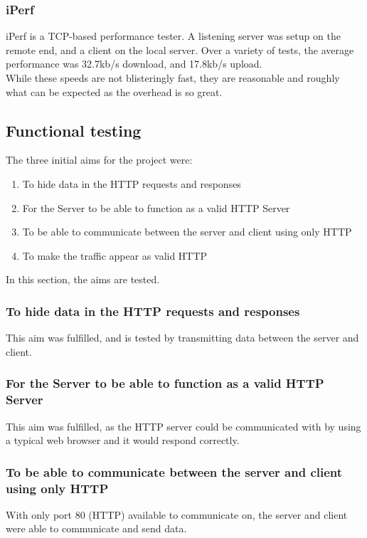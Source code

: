 \subsubsection*{iPerf}
iPerf is a TCP-based performance tester.
A listening server was setup on the remote end, and a client on the local server.
Over a variety of tests, the average performance was 32.7kb/s download, and 17.8kb/s upload.\\
While these speeds are not blisteringly fast, they are reasonable and roughly what can be expected as the overhead is so great.

\subsection{Functional testing}
The three initial aims for the project were:
\begin{enumerate}
    \item To hide data in the HTTP requests and responses
    \item For the Server to be able to function as a valid HTTP Server
    \item To be able to communicate between the server and client using only HTTP
    \item To make the traffic appear as valid HTTP
\end{enumerate}
In this section, the aims are tested.
\subsubsection*{To hide data in the HTTP requests and responses}
This aim was fulfilled, and is tested by transmitting data between the server and client.

\subsubsection*{For the Server to be able to function as a valid HTTP Server}
This aim was fulfilled, as the HTTP server could be communicated with by using a typical web browser and it would respond correctly.

\subsubsection*{To be able to communicate between the server and client using only HTTP}
With only port 80 (HTTP) available to communicate on, the server and client were able to communicate and send data.

